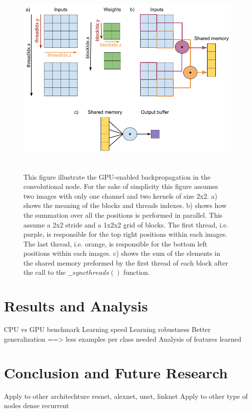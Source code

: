 \documentclass[11pt]{report}
\begin{document}
\begin{figure}[h]
\centering
\includegraphics[width=13cm, height=10cm]{conv2d_backpropagation}
\caption{This figure illustrate the GPU-enabled backpropagation in the convolutional node. For the sake of simplicity this figure assumes two images with only one channel and two kernels of size 2x2. a) shows the meaning of the blocks and threads indexes. b) shows how the summation over all the positions is performed in parallel. This assume a 2x2 stride and a 1x2x2 grid of blocks. The first thread, i.e. purple, is responsible for the top right positions within each images. The last thread, i.e. orange, is responsible for the bottom left positions within each images. c) shows the sum of the elements in the shared memory preformed by the first thread of each block after the call to the $\_\_syncthreads()$ function.}
\label{fig:conv2d_backpropagation}
\end{figure}

\chapter{Results and Analysis} \label{result_and_analysis}

CPU vs GPU benchmark
Learning speed
Learning robustness
Better generalization ==> less examples per class needed
Analysis of features learned

\chapter{Conclusion and Future Research} \label{conclusion}


Apply to other architechture resnet, alexnet, unet, linknet
Apply to other type of nodes dense recurrent

\printbibliography
\end{document}
